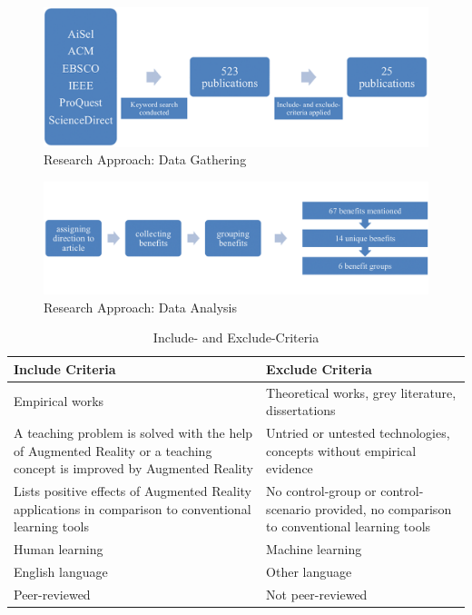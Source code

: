 \begin{figure}[ptbh]
    \centering
    \includegraphics[width=\linewidth]{figures/research_approach_part_1.png}
    \caption[Research Approach: Data Gathering]{Research Approach: Data Gathering}
    \label{fig:ResearchApproachGathering}
\end{figure}

\begin{figure}[ptbh]
    \centering
    \includegraphics[width=\linewidth]{figures/research_approach_part_2.png}
    \caption[Research Approach: Data Analysis]{Research Approach: Data Analysis}
    \label{fig:ResearchApproachAnalysis}
\end{figure}

\begin{table}[ptbh]
    \center
    \vspace{1em}
    \begin{tabular}{p{17em} | p{17em}}
        \textbf{Include Criteria} & \textbf{Exclude Criteria} \\
        \hline
        Empirical works & Theoretical works, grey literature, dissertations \\
        A teaching problem is solved with the help of Augmented Reality or a teaching concept is improved by Augmented Reality & Untried or untested technologies, concepts without empirical evidence \\
        Lists positive effects of Augmented Reality applications in comparison to conventional learning tools & No control-group or control-scenario provided, no comparison to conventional learning tools \\
        Human learning & Machine learning \\
        English language & Other language \\
        Peer-reviewed & Not peer-reviewed \\
    \end{tabular}
    \caption[Include- and Exclude-Criteria]{Include- and Exclude-Criteria}
    \label{tab:IncludeExcludeCriteria}
\end{table}

